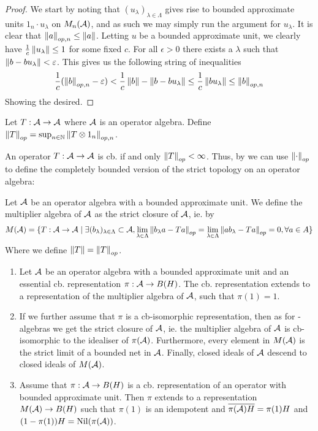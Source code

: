 \begin{proof}
	We start by noting that $(u_\lambda)_{\lambda\in \Lambda}$ gives rise to bounded approximate units $1_n \cdot u_\lambda$ on $M_n(\mathcal{A})$, and as such we may simply run the argument for $u_\lambda$.
	It is clear that $\left \Vert a \right \Vert_{op,n}\leq \left \Vert a \right \Vert$. Letting $u$ be a bounded approximate unit, we clearly have $\frac{1}{c}\left \Vert u_{\lambda} \right \Vert\leq 1$ for some fixed $c$. For all $\epsilon>0$ there exists a $\lambda$ such that $\left \Vert b-bu_\lambda \right \Vert<\varepsilon$. This gives us the following string of inequalities
	\begin{align*}
		\frac{1}{c}(\left \Vert b \right \Vert_{op,n}-\varepsilon)<\frac{1}{c}\left \Vert b \right \Vert-\left \Vert b-bu_\lambda \right \Vert\leq \frac{1}{c} \left \Vert bu_\lambda \right \Vert \leq \left \Vert b \right \Vert_{op,n}
	\end{align*}
	Showing the desired. 
\end{proof}
\begin{definition}
	Let $T:\mathcal{A}\to \mathcal{A}$ where $\mathcal{A}$ is an operator algebra. Define $\left \Vert T \right \Vert_{op}=\sup_{n \in \mathbb{N}} \left \Vert T\otimes 1_n \right \Vert_{op,n}$. 
\end{definition}
An operator $T:\mathcal{A}\to \mathcal{A}$ is cb. if and only $\left \Vert T \right \Vert_{op}<\infty$. Thus, by  we can use $\left \Vert \cdot \right \Vert_{op}$ to define the completely bounded version of the strict topology on an operator algebra: 
\begin{definition}
	Let $\mathcal{A}$ be an operator algebra with a bounded approximate unit. We define the multiplier algebra of $\mathcal{A}$ as the strict closure of $\mathcal{A}$, ie. by
	\begin{align*}
		M(\mathcal{A})=\{T:\mathcal{A}\to \mathcal{A}\mid \exists (b_\lambda)_{\lambda \in \Lambda}\subset \mathcal{A}, \lim_{\lambda \in \Lambda} \left \Vert b_\lambda a-Ta \right \Vert_{op}=\lim_{\lambda \in \Lambda}\left \Vert ab_\lambda-T a \right \Vert_{op}=0, \forall a \in A\}
	\end{align*}
	Where we define $\left \Vert T \right \Vert=\left \Vert T \right \Vert_{op}$. 
\end{definition}
\begin{theorem}\label{mesrennie114}
\begin{enumerate}
	\item Let $\mathcal{A}$ be an operator algebra with a bounded approximate unit and an essential cb. representation $\pi:\mathcal{A}\to B(H)$. The cb. representation extends to a representation of the multiplier algebra of $\mathcal{A}$, such that $\pi(1)=1$. 
	\item If we further assume that $\pi$ is a cb-isomorphic representation, then as for \Cstar-algebras we get the strict closure of $\mathcal{A}$, ie. the multiplier algebra of $\mathcal{A}$ is cb-isomorphic to the idealiser of $\pi(\mathcal{A})$. Furthermore, every element in $M(\mathcal{A})$ is the strict limit of a bounded net in $\mathcal{A}$. Finally, closed ideals of $\mathcal{A}$ descend to closed ideals of $M(\mathcal{A})$. 
	\item Assume that $\pi:\mathcal{A}\to B(H)$ is a cb. representation of an operator with bounded approximate unit. Then $\pi$ extends to a representation $M(\mathcal{A})\to B(H)$ such that $\pi(1)$ is an idempotent and $\overline{\pi(\mathcal{A})H}=\pi(1)H$ and $(1-\pi(1))H=\operatorname{Nil}(\pi(\mathcal{A}))$. 
	\end{enumerate}
\end{theorem}

